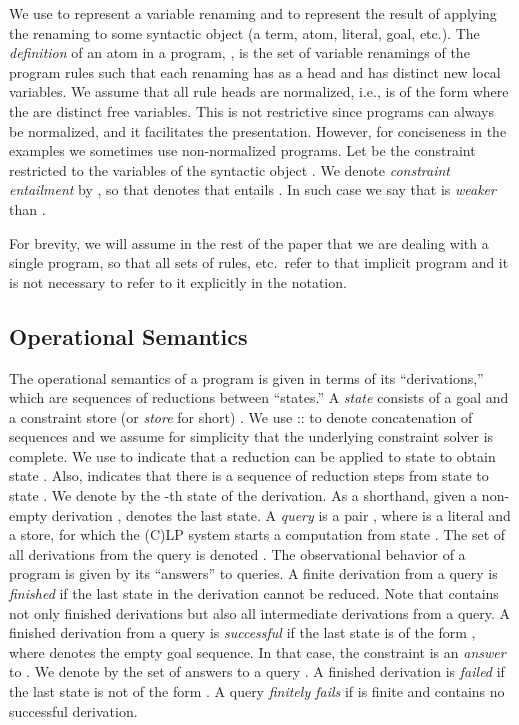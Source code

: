 \documentclass{llncs}
\begin{document}
We use  to represent a variable renaming and  to
represent the result of applying the renaming  to some
syntactic object  (a term, atom, literal, goal, etc.).
The \emph{definition} of an atom  in a program, , is the
set of variable renamings of the program rules such that each renaming
has  as a head and has distinct new local variables.
We assume that all rule heads are normalized, i.e.,  is of the form  
 where the  are distinct free
variables. This is not restrictive since programs can always be
normalized, and it facilitates the presentation. However, for
conciseness in the examples
we sometimes use non-normalized programs.
Let  be the constraint 
restricted to the variables of the syntactic object . We denote
\emph{constraint entailment} by , so that  denotes that  entails . In such case we
say that  is \emph{weaker} than .

For brevity, we will assume in the rest of the paper that we
are dealing with a single program, so that all sets of rules, etc.\
refer to that implicit program and it is not necessary to refer to it
explicitly in the notation.



\subsection{Operational Semantics}

The operational semantics of a program is given in terms of its
``derivations,'' which are sequences of reductions between ``states.'' 
A \emph{state}  consists of a goal  and a
constraint store (or \emph{store} for short) .
We use :: to denote concatenation of sequences and we assume for
simplicity that the underlying constraint solver is complete.
We use  to indicate that a reduction can be applied
to state  to obtain state . Also, 
indicates that there is a sequence of reduction steps from state 
to state .
We denote by  the -th state of the derivation. As
a shorthand, given a non-empty derivation ,  denotes 
the last state.
A \emph{query} is a pair , where  is a literal and
 a store, for which the (C)LP system starts a computation from
state .
The set of all derivations from the query  is denoted
.
The observational behavior of a program is given by its ``answers'' to
queries. A finite derivation from a query  is
\emph{finished} if the last state in the derivation cannot be
reduced. 
Note that  contains not only finished derivations but
also all intermediate derivations from a query.
A finished derivation from a query  is
\emph{successful} if the last state is of the form
, where  denotes the empty
goal sequence. In that case, the constraint 
is an \emph{answer} to .
We denote by  the set of answers to a query .
A finished derivation is \emph{failed} if the last state is not of the
form .
A query  \emph{finitely fails} if  is
finite and contains no successful derivation.
\end{document}
